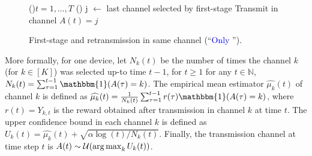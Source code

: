 \begin{figure}[h!]
	\centering
    \begin{framed}
	\begin{algorithm}[H]
		\For(){$t = 1, \dots, T$}{
			\uElse(){
				j $\leftarrow$ last channel selected by first-stage \UCB\;
				Transmit in channel $A(t) = j$\;
			}
		}
		\caption[First-stage \UCB{} and retransmission in same channel.]{First-stage \UCB{} and retransmission in same channel (``\textcolor{blue}{Only \UCB{}}'').}
		\label{algo:43:UCB}
	\end{algorithm}
	\end{framed}
\end{figure}


More formally, for one device, let $N_k(t)$ be the number of times the channel $k$ (for $k\in [K]$) was selected up-to time $t-1$, for $t\geq1$
for any $t\in\mathbb{N}$,
$N_k(t) = \sum_{\tau=1}^{t-1} \mathbbm{1}(A(\tau) = k)$.
The empirical mean estimator $\widehat{\mu_k}(t)$ of channel $k$ is defined as $\widehat{\mu_k}(t) = \frac{1}{N_k(t)} \sum_{\tau=1}^{t-1} r(\tau) \mathbbm{1}(A(\tau) = k)$,
where $r(t)=Y_{k,t}$ is the reward obtained after transmission in channel $k$ at time $t$.
The upper confidence bound in each channel $k$ is defined as
$U_k(t) = \widehat{\mu_k}(t) + \sqrt{\alpha \log(t) / N_k(t)}$.
Finally, the transmission channel at time step $t$
is $A(t) \sim \mathcal{U}(\operatorname*{arg\,max}_k U_k(t))$.

